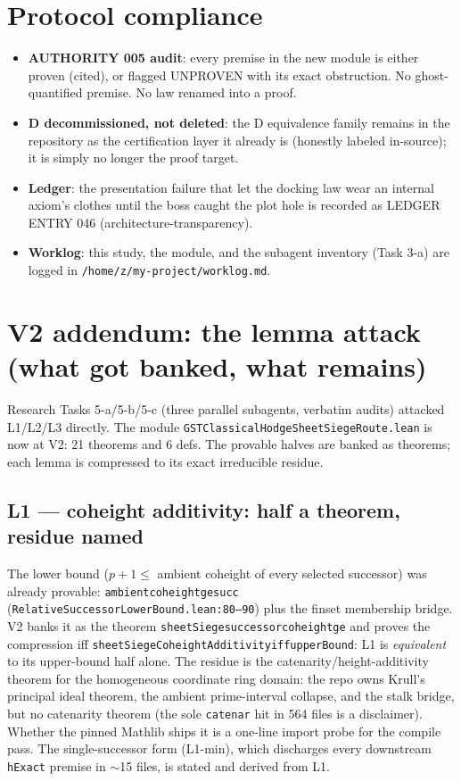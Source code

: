 \documentclass[11pt]{article}
\renewcommand{\_}{\textunderscore\allowbreak}
\begin{document}
\section{Protocol compliance}

\begin{itemize}[leftmargin=2em]
\item \textbf{AUTHORITY 005 audit}: every premise in the new module is either
proven (cited), or flagged UNPROVEN with its exact obstruction. No
ghost-quantified premise. No law renamed into a proof.
\item \textbf{D decommissioned, not deleted}: the D equivalence family remains
in the repository as the certification layer it already is (honestly labeled
in-source); it is simply no longer the proof target.
\item \textbf{Ledger}: the presentation failure that let the docking law wear
an internal axiom's clothes until the boss caught the plot hole is recorded
as LEDGER ENTRY 046 (architecture-transparency).
\item \textbf{Worklog}: this study, the module, and the subagent inventory
(Task 3-a) are logged in \texttt{/home/z/my-project/worklog.md}.
\end{itemize}

\section{V2 addendum: the lemma attack (what got banked, what remains)}

Research Tasks 5-a/5-b/5-c (three parallel subagents, verbatim audits) attacked
L1/L2/L3 directly. The module
\texttt{GSTClassicalHodgeSheetSiegeRoute.lean} is now at V2: 21 theorems and
6 defs. The provable halves are banked as theorems; each lemma is compressed
to its exact irreducible residue.

\subsection*{L1 --- coheight additivity: half a theorem, residue named}

The lower bound ($p+1 \le$ ambient coheight of every selected successor) was
already provable: \texttt{ambient\_coheight\_ge\_succ}
(\texttt{RelativeSuccessorLowerBound.lean:80--90}) plus the finset membership
bridge. V2 banks it as the theorem \texttt{sheetSiege\_successor\_coheight\_ge}
and proves the compression iff
\texttt{sheetSiegeCoheightAdditivity\_iff\_upperBound}:
L1 is \emph{equivalent} to its upper-bound half alone. The residue is the
catenarity/height-additivity theorem for the homogeneous coordinate ring
domain: the repo owns Krull's principal ideal theorem, the ambient
prime-interval collapse, and the stalk bridge, but no catenarity theorem (the
sole \texttt{catenar} hit in 564 files is a disclaimer). Whether the pinned
Mathlib ships it is a one-line import probe for the compile pass. The
single-successor form (L1-min), which discharges every downstream
\texttt{hExact} premise in $\sim$15 files, is stated and derived from L1.
\end{document}
